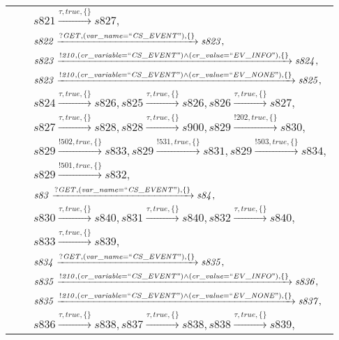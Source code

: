 \begin{tabular}{lcl}
& & $\mathit{s821}\xrightarrow{\mathit{\tau}, \mathit{true}, \{\}}\mathit{s827},$ \\
& & $\mathit{s822}\xrightarrow{\mathit{?GET}, \mathit{(var\_name = ``CS\_EVENT")}, \{\}}\mathit{s823},$ \\
& & $\mathit{s823}\xrightarrow{\mathit{!210}, \mathit{(cr\_variable = ``CS\_EVENT") \land (cr\_value = ``EV\_INFO")}, \{\}}\mathit{s824},$ \\
& & $\mathit{s823}\xrightarrow{\mathit{!210}, \mathit{(cr\_variable = ``CS\_EVENT") \land (cr\_value = ``EV\_NONE")}, \{\}}\mathit{s825},$ \\
& & $\mathit{s824}\xrightarrow{\mathit{\tau}, \mathit{true}, \{\}}\mathit{s826},\mathit{s825}\xrightarrow{\mathit{\tau}, \mathit{true}, \{\}}\mathit{s826},\mathit{s826}\xrightarrow{\mathit{\tau}, \mathit{true}, \{\}}\mathit{s827},$ \\
& & $\mathit{s827}\xrightarrow{\mathit{\tau}, \mathit{true}, \{\}}\mathit{s828},\mathit{s828}\xrightarrow{\mathit{\tau}, \mathit{true}, \{\}}\mathit{s900},\mathit{s829}\xrightarrow{\mathit{!202}, \mathit{true}, \{\}}\mathit{s830},$ \\
& & $\mathit{s829}\xrightarrow{\mathit{!502}, \mathit{true}, \{\}}\mathit{s833},\mathit{s829}\xrightarrow{\mathit{!531}, \mathit{true}, \{\}}\mathit{s831},\mathit{s829}\xrightarrow{\mathit{!503}, \mathit{true}, \{\}}\mathit{s834},$ \\
& & $\mathit{s829}\xrightarrow{\mathit{!501}, \mathit{true}, \{\}}\mathit{s832},$ \\
& & $\mathit{s83}\xrightarrow{\mathit{?GET}, \mathit{(var\_name = ``CS\_EVENT")}, \{\}}\mathit{s84},$ \\
& & $\mathit{s830}\xrightarrow{\mathit{\tau}, \mathit{true}, \{\}}\mathit{s840},\mathit{s831}\xrightarrow{\mathit{\tau}, \mathit{true}, \{\}}\mathit{s840},\mathit{s832}\xrightarrow{\mathit{\tau}, \mathit{true}, \{\}}\mathit{s840},$ \\
& & $\mathit{s833}\xrightarrow{\mathit{\tau}, \mathit{true}, \{\}}\mathit{s839},$ \\
& & $\mathit{s834}\xrightarrow{\mathit{?GET}, \mathit{(var\_name = ``CS\_EVENT")}, \{\}}\mathit{s835},$ \\
& & $\mathit{s835}\xrightarrow{\mathit{!210}, \mathit{(cr\_variable = ``CS\_EVENT") \land (cr\_value = ``EV\_INFO")}, \{\}}\mathit{s836},$ \\
& & $\mathit{s835}\xrightarrow{\mathit{!210}, \mathit{(cr\_variable = ``CS\_EVENT") \land (cr\_value = ``EV\_NONE")}, \{\}}\mathit{s837},$ \\
& & $\mathit{s836}\xrightarrow{\mathit{\tau}, \mathit{true}, \{\}}\mathit{s838},\mathit{s837}\xrightarrow{\mathit{\tau}, \mathit{true}, \{\}}\mathit{s838},\mathit{s838}\xrightarrow{\mathit{\tau}, \mathit{true}, \{\}}\mathit{s839},$ \\
\end{tabular}

